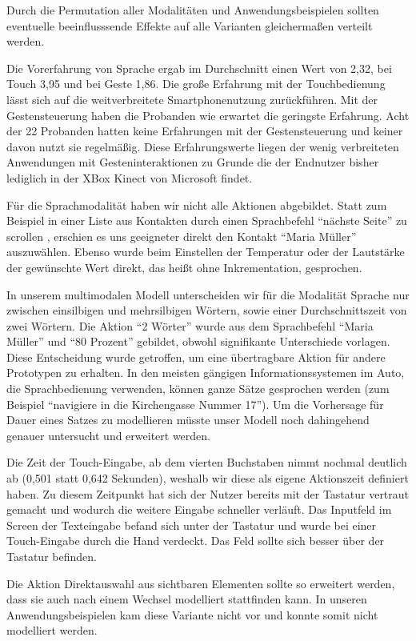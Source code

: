 Durch die Permutation aller Modalitäten und Anwendungsbeispielen sollten eventuelle beeinflusssende Effekte auf alle Varianten gleichermaßen verteilt werden.

Die Vorerfahrung von Sprache ergab im Durchschnitt einen Wert von 2,32, bei Touch 3,95 und bei Geste 1,86.
Die große Erfahrung mit der Touchbedienung lässt sich auf die weitverbreitete Smartphonenutzung zurückführen.
Mit der Gestensteuerung haben die Probanden wie erwartet die geringste Erfahrung.
Acht der 22 Probanden hatten keine Erfahrungen mit der Gestensteuerung und keiner davon nutzt sie regelmäßig.
Diese Erfahrungswerte liegen der wenig verbreiteten Anwendungen mit Gesteninteraktionen zu Grunde die der Endnutzer bisher lediglich in der XBox Kinect von Microsoft findet.

Für die Sprachmodalität haben wir nicht alle Aktionen abgebildet.
Statt zum Beispiel in einer Liste aus Kontakten durch einen Sprachbefehl "`nächste Seite"' zu scrollen , erschien es uns geeigneter direkt den Kontakt "`Maria Müller"' auszuwählen.
Ebenso wurde beim Einstellen der Temperatur oder der Lautstärke der gewünschte Wert direkt, das heißt ohne Inkrementation, gesprochen.

In unserem multimodalen Modell unterscheiden wir für die Modalität Sprache nur zwischen einsilbigen und mehrsilbigen Wörtern, sowie einer Durchschnittszeit von zwei Wörtern.
Die Aktion "`2 Wörter"' wurde aus dem Sprachbefehl "`Maria Müller"' und "`80 Prozent"' gebildet, obwohl signifikante Unterschiede vorlagen.
Diese Entscheidung wurde getroffen, um eine übertragbare Aktion für andere Prototypen zu erhalten.
In den meisten gängigen Informationssystemen im Auto, die Sprachbedienung verwenden, können ganze Sätze gesprochen werden (zum Beispiel "`navigiere in die Kirchengasse Nummer 17"').
Um die Vorhersage für Dauer eines Satzes zu modellieren müsste unser Modell noch dahingehend genauer untersucht und erweitert werden.

Die Zeit der Touch-Eingabe, ab dem vierten Buchstaben nimmt nochmal deutlich ab (0,501 statt 0,642 Sekunden), weshalb wir diese als eigene Aktionszeit definiert haben.
Zu diesem Zeitpunkt hat sich der Nutzer bereits mit der Tastatur vertraut gemacht und wodurch die weitere Eingabe schneller verläuft.
Das Inputfeld im Screen der Texteingabe befand sich unter der Tastatur und wurde bei einer Touch-Eingabe durch die Hand verdeckt.
Das Feld sollte sich besser über der Tastatur befinden.

Die Aktion Direktauswahl aus sichtbaren Elementen sollte so erweitert werden, dass sie auch nach einem Wechsel modelliert stattfinden kann.
In unseren Anwendungsbeispielen kam diese Variante nicht vor und konnte somit nicht modelliert werden.

